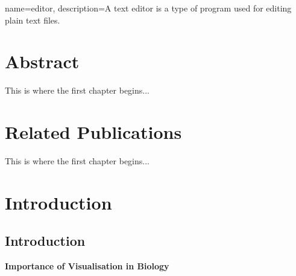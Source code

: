 
{
	name={editor},
	description={A text editor is a type of program used for editing plain text files.}
}

\chapter{Abstract}


This is where the first chapter begins...


\chapter{Related Publications}

This is where the first chapter begins...

\chapter{Introduction}

\section{Introduction}

%
%
%
%
%
%
%


\textbf{Importance of Visualisation in Biology}


